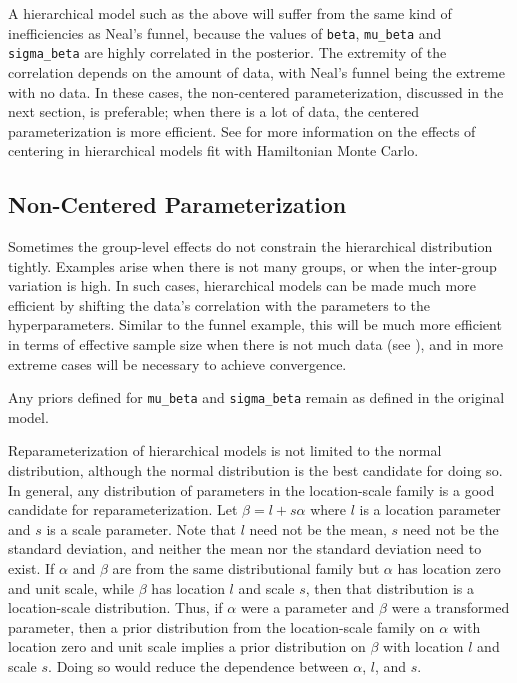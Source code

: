 A hierarchical model such as the above will suffer from the same kind
of inefficiencies as Neal's funnel, because the values of \Verb|beta|,
\Verb|mu_beta| and \Verb|sigma_beta| are highly correlated in the
posterior.  The extremity of the correlation depends on the amount of
data, with Neal's funnel being the extreme with no data.  In these
cases, the non-centered parameterization, discussed in the next
section, is preferable; when there is a lot of data, the centered
parameterization is more efficient.  See
\cite{Betancourt-Girolami:2013} for more information on the effects of
centering in hierarchical models fit with Hamiltonian Monte Carlo.


\subsection{Non-Centered Parameterization}

Sometimes the group-level effects do not constrain the hierarchical
distribution tightly.  Examples arise when there is not many groups,
or when the inter-group variation is high.  In such cases,
hierarchical models can be made much more efficient by shifting the
data's correlation with the parameters to the hyperparameters. Similar
to the funnel example, this will be much more efficient in terms of
effective sample size when there is not much data (see
\citep{Betancourt-Girolami:2013}), and in more extreme cases will be
necessary to achieve convergence.
%
\begin{stancode}
parameters {
  vector[K] beta_raw;
  ...
transformed parameters {
  vector[K] beta;
  // implies: beta ~ normal(mu_beta, sigma_beta)
  beta = mu_beta + sigma_beta * beta_raw;
model {
  beta_raw ~ normal(0, 1);
  ...
\end{stancode}
%
Any priors defined for \Verb|mu_beta| and \Verb|sigma_beta| remain as
defined in the original model.

Reparameterization of hierarchical models is not limited to the normal
distribution, although the normal distribution is the best candidate
for doing so. In general, any distribution of parameters in the
location-scale family is a good candidate for reparameterization. Let
$\beta = l + s\alpha$ where $l$ is a location parameter and $s$ is a
scale parameter. Note that $l$ need not be the mean, $s$ need not
be the standard deviation, and neither the mean nor the standard
deviation need to exist. If $\alpha$ and $\beta$ are from the same
distributional family but $\alpha$ has location zero and unit scale,
while $\beta$ has location $l$ and scale $s$, then that distribution
is a location-scale distribution. Thus, if $\alpha$ were a parameter
and $\beta$ were a transformed parameter, then a prior distribution
from the location-scale family on $\alpha$ with location zero and unit
scale implies a prior distribution on $\beta$ with location $l$ and
scale $s$. Doing so would reduce the dependence between $\alpha$,
$l$, and $s$.


